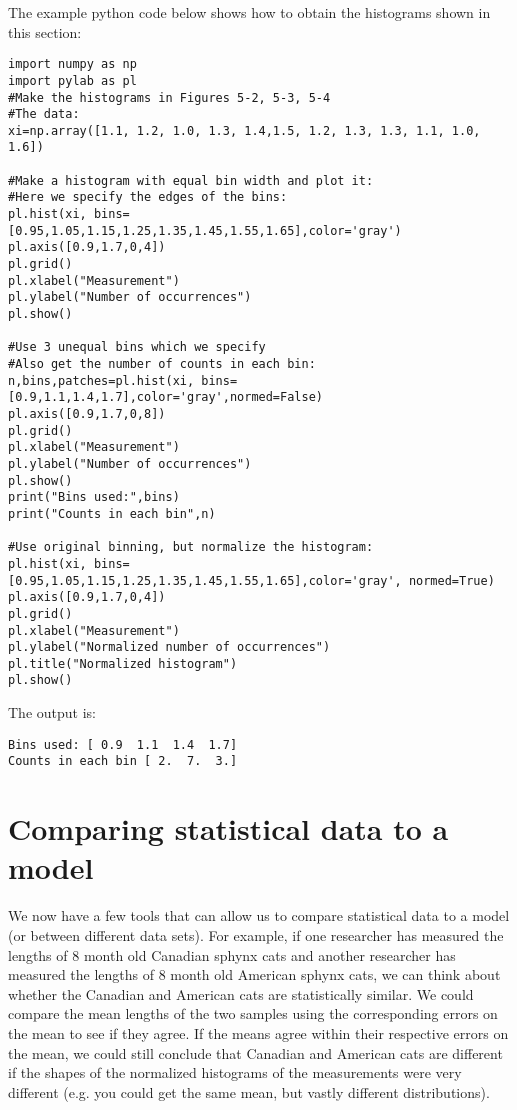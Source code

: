 The example python code below shows how to obtain the histograms shown in this section:
\begin{lstlisting}[frame=single] 
import numpy as np
import pylab as pl
#Make the histograms in Figures 5-2, 5-3, 5-4
#The data:
xi=np.array([1.1, 1.2, 1.0, 1.3, 1.4,1.5, 1.2, 1.3, 1.3, 1.1, 1.0, 1.6])

#Make a histogram with equal bin width and plot it:
#Here we specify the edges of the bins:
pl.hist(xi, bins=[0.95,1.05,1.15,1.25,1.35,1.45,1.55,1.65],color='gray')
pl.axis([0.9,1.7,0,4])
pl.grid()
pl.xlabel("Measurement")
pl.ylabel("Number of occurrences")
pl.show()

#Use 3 unequal bins which we specify
#Also get the number of counts in each bin:
n,bins,patches=pl.hist(xi, bins=[0.9,1.1,1.4,1.7],color='gray',normed=False)
pl.axis([0.9,1.7,0,8])
pl.grid()
pl.xlabel("Measurement")
pl.ylabel("Number of occurrences")
pl.show()
print("Bins used:",bins)
print("Counts in each bin",n)

#Use original binning, but normalize the histogram:
pl.hist(xi, bins=[0.95,1.05,1.15,1.25,1.35,1.45,1.55,1.65],color='gray', normed=True)
pl.axis([0.9,1.7,0,4])
pl.grid()
pl.xlabel("Measurement")
pl.ylabel("Normalized number of occurrences")
pl.title("Normalized histogram")
pl.show()
\end{lstlisting}
The output is:
\begin{verbatim}
Bins used: [ 0.9  1.1  1.4  1.7]
Counts in each bin [ 2.  7.  3.]
\end{verbatim}

\section{Comparing statistical data to a model}
We now have a few tools that can allow us to compare statistical data to a model (or between different data sets). For example, if one researcher has measured the lengths of 8 month old Canadian sphynx cats and another researcher has measured the lengths of 8 month old American sphynx cats, we can think about whether the Canadian and American cats are statistically similar. We could compare the mean lengths of the two samples using the corresponding errors on the mean to see if they agree. If the means agree within their respective errors on the mean, we could still conclude that Canadian and American cats are different if the shapes of the normalized histograms of the measurements were very different (e.g. you could get the same mean, but vastly different distributions).

